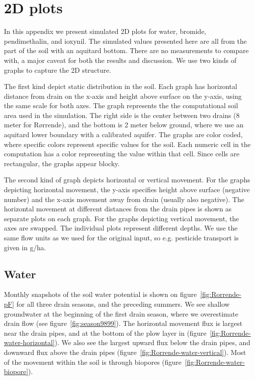 \newcommand{\figrorrende}[1]{\texttt{[image: fig/\#1]}}
\newcommand{\figrorrendel}[1]{\hspace*{-2cm}\figrorrende{#1}}

\chapter{2D plots}
\label{app:plot-2d}

In this appendix we present simulated 2D plots for water, bromide,
pendimethalin, and ioxynil.  The simulated values presented here are
all from the part of the soil with an aquitard bottom.  There are no
measurements to compare with, a major caveat for both the results and
discussion.  We use two kinds of graphs to capture the 2D structure.

The first kind depict static distribution in the soil.  Each graph has
horizontal distance from drain on the x-axis and height above surface
on the y-axis, using the same scale for both axes.  The graph
represents the the computational soil area used in the simulation.
The right side is the center between two drains (8 meter for
R{\o}rrende), and the bottom is 2 meter below ground, where we use an
aquitard lower boundary with a calibrated aquifer.  The graphs are
color coded, where specific colors represent specific values for the
soil.  Each numeric cell in the computation has a color representing
the value within that cell.  Since cells are rectangular, the graphs
appear blocky.

The second kind of graph depicts horizontal or vertical movement.  For
the graphs depicting horizontal movement, the y-axis specifies height
above surface (negative number) and the x-axis movement away from
drain (usually also negative).  The horizontal movement at different
distances from the drain pipes is shown as separate plots on each
graph.  For the graphs depicting vertical movement, the axes are
swapped.  The individual plots represent different depths.  We use the
same flow units as we used for the original input, so e.g. pesticide
transport is given in g/ha.

\FloatBarrier
\section{Water}

Monthly snapshots of the soil water potential is shown on
figure~\ref{fig:Rorrende-pF} for all three drain seasons, and the
preceding summers. We see shallow groundwater at the beginning of the
first drain season, where we overestimate drain flow (see
figure~\ref{fig:season9899}).  The horizontal movement flux is largest
near the drain pipes, and at the bottom of the plow layer in
(figure~\ref{fig:Rorrende-water-horizontal}).  We also see the largest
upward flux below the drain pipes, and downward flux above the drain
pipes (figure~\ref{fig:Rorrende-water-vertical}).  Most of the
movement within the soil is through biopores
(figure~\ref{fig:Rorrende-water-biopore}).

